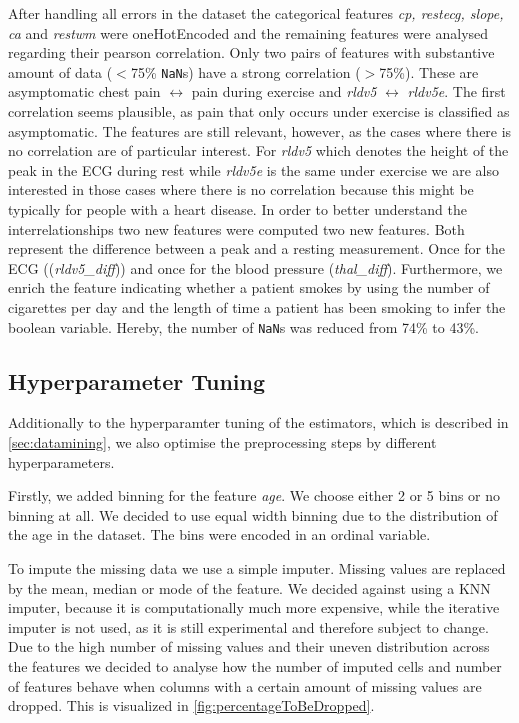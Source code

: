 After handling all errors in the dataset the categorical features \textit{cp, restecg, slope, ca} and \textit{restwm} were oneHotEncoded and the remaining features were analysed regarding their pearson correlation. Only two pairs of features with substantive amount of data ($<$75\% \texttt{NaN}s) have a strong correlation ($>$75\%).  
These are asymptomatic chest pain $\leftrightarrow$ pain during exercise and \textit{rldv5} $\leftrightarrow$ \textit{rldv5e}. The first correlation seems plausible, as pain that only occurs under exercise is classified as asymptomatic. The features are still relevant, however, as the cases where there is no correlation are of particular interest. For \textit{rldv5} which denotes the height of the peak in the ECG during rest while \textit{rldv5e} is the same under exercise we are also interested in those cases where there is no correlation because this might be typically for people with a heart disease. In order to better understand the interrelationships two new features were computed two new features. Both represent the difference between a peak and a resting measurement. Once for the ECG ((\textit{rldv5\_diff})) and once for the blood pressure (\textit{thal\_diff}). 
Furthermore, we enrich the feature indicating whether a patient smokes by using the number of cigarettes per day and the length of time a patient has been smoking to infer the boolean variable. Hereby, the number of \texttt{NaN}s was reduced from 74\% to 43\%. 

\subsection{Hyperparameter Tuning} \label{subsec:hyperparametertuning}
Additionally to the hyperparamter tuning of the estimators, which is described in \cref{sec:datamining}, we also optimise the preprocessing steps by different hyperparameters.

Firstly, we added binning for the feature \textit{age}. We choose either 2 or 5 bins or no binning at all. We decided to use equal width binning due to the distribution of the age in the dataset.  The bins were encoded in an ordinal variable.

To impute the missing data we use a simple imputer. Missing values are replaced by the mean, median or mode of the feature. We decided against using a KNN imputer, because it is computationally much more expensive, while the iterative imputer is not used, as it is still experimental and therefore subject to change. Due to the high number of missing values and their uneven distribution across the features we decided to analyse how the number of imputed cells and number of features behave when columns with a certain amount of missing values are dropped. This is visualized in \cref{fig:percentageToBeDropped}.

